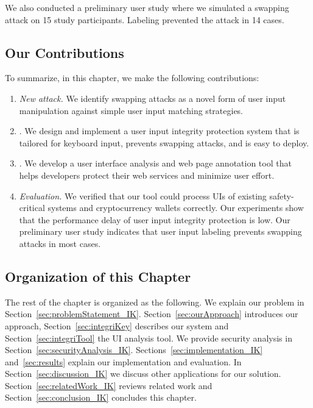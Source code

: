 We also conducted a preliminary user study where we simulated a swapping attack on 15 study participants. Labeling prevented the attack in 14 cases.


\subsection{Our Contributions} To summarize, in this chapter, we make the following contributions:

\begin{enumerate}
    \item \emph{New attack.} We identify swapping attacks as a novel form of user input manipulation against simple user input matching strategies.
    \item \name. We design and implement a user input integrity protection system that is tailored for keyboard input, prevents swapping attacks, and is easy to deploy.
    \item \tool. We develop a user interface analysis and web page annotation tool that helps developers protect their web services and minimize user effort.
    \item \emph{Evaluation.} We verified that our tool could process UIs of existing safety-critical systems and cryptocurrency wallets correctly. Our experiments show that the performance delay of \name user input integrity protection is low. Our preliminary user study indicates that user input labeling prevents swapping attacks in most cases.
\end{enumerate}


\subsection{Organization of this Chapter} The rest of the chapter is organized as the following. We explain our problem in Section~\ref{sec:problemStatement_IK}. Section~\ref{sec:ourApproach} introduces our approach, Section~\ref{sec:integriKey} describes our system and Section~\ref{sec:integriTool} the UI analysis tool. We provide security analysis in Section~\ref{sec:securityAnalysis_IK}. Sections~\ref{sec:implementation_IK} and~\ref{sec:results} explain our implementation and evaluation. In Section~\ref{sec:discussion_IK} we discuss other applications for our solution. Section~\ref{sec:relatedWork_IK} reviews related work and Section~\ref{sec:conclusion_IK} concludes this chapter.



